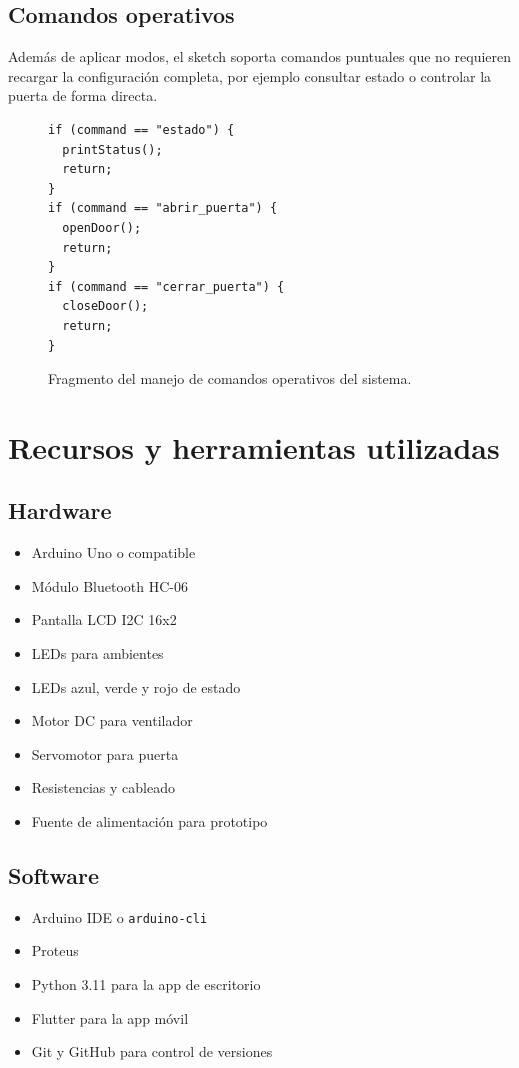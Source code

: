 \documentclass[12pt,a4paper]{article}
\begin{document}
\subsection{Comandos operativos}
Además de aplicar modos, el sketch soporta comandos puntuales que no requieren recargar la configuración completa, por ejemplo consultar estado o controlar la puerta de forma directa.

\begin{figure}[H]
    \centering
    \begin{minipage}{0.9\textwidth}
        \begin{lstlisting}[basicstyle=\ttfamily\footnotesize]
if (command == "estado") {
  printStatus();
  return;
}
if (command == "abrir_puerta") {
  openDoor();
  return;
}
if (command == "cerrar_puerta") {
  closeDoor();
  return;
}
        \end{lstlisting}
    \end{minipage}
    \caption{Fragmento del manejo de comandos operativos del sistema.}
\end{figure}

\section{Recursos y herramientas utilizadas}

\subsection{Hardware}
\begin{itemize}[leftmargin=1.2cm]
    \item Arduino Uno o compatible
    \item Módulo Bluetooth HC-06
    \item Pantalla LCD I2C 16x2
    \item LEDs para ambientes
    \item LEDs azul, verde y rojo de estado
    \item Motor DC para ventilador
    \item Servomotor para puerta
    \item Resistencias y cableado
    \item Fuente de alimentación para prototipo
\end{itemize}

\subsection{Software}
\begin{itemize}[leftmargin=1.2cm]
    \item Arduino IDE o \texttt{arduino-cli}
    \item Proteus
    \item Python 3.11 para la app de escritorio
    \item Flutter para la app móvil
    \item Git y GitHub para control de versiones
\end{itemize}
\end{document}
